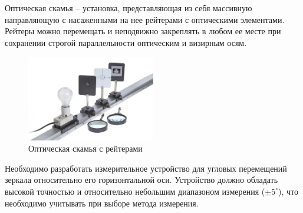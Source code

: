 \label{sec:analys}

Оптическая скамья -- установка, представляющая из себя массивную направляющую с насаженными на нее рейтерами с оптическими элементами.
Рейтеры можно перемещать и неподвижно закреплять в любом ее месте при сохранении строгой параллельности оптическим и визирным осям.
\begin{figure}[!h]
    \centering
    \includegraphics[width=0.5\textwidth]{img/img}
    \caption{Оптическая скамья с рейтерами}
    \label{fig:img}
\end{figure}

Необходимо разработать измерительное устройство для угловых перемещений зеркала относительно его горизонтальной оси.
Устройство должно обладать высокой точностью и относительно небольшим диапазоном измерения ($\pm5^\circ$), что необходимо учитывать при выборе метода измерения.
